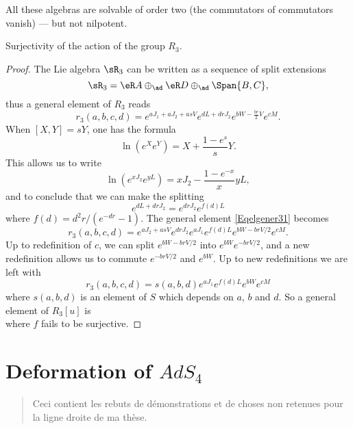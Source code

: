 \let\ANCtheenumi\theenumi
All these algebras are solvable of order two (the commutators of commutators vanish) --- but not nilpotent.

\begin{proposition}
Surjectivity of the action of the group $R_3$.
\end{proposition}

\begin{proof}
The Lie algebra $\sR_3$ can be written as a sequence of split extensions
\[
  \sR_3=\eR A\oplus_{\ad}\eR D\oplus_{\ad}\Span\{ B,C \},
\]
thus a general element of $R_3$ reads
\begin{equation}  \label{Eqelgener31}
r_3(a,b,c,d)= e^{aJ_1+aJ_2+asV} e^{dL+drJ_2} e^{bW-\frac{ br }{2}V} e^{cM}.
\end {equation}
When $[X,Y]=sY$, one has the formula
\begin{equation}
 \ln(e^{X} e^{Y})=X+\frac{ 1- e^{s} }{ s }Y.
\end{equation}
This allows us to write
\[
  \ln( e^{xJ_2} e^{yL})= xJ_2-\frac{ 1- e^{-x} }{ x }yL,
\]
and to conclude that we can make the splitting
\[
   e^{dL+drJ_2}= e^{drJ_2} e^{f(d)L}
\]
where $f(d)=d^{2}r/( e^{-dr}-1)$. The general element \eqref{Eqelgener31} becomes
\[
  r_3(a,b,c,d)= e^{aJ_2+asV} e^{drJ_2} e^{aJ_1} e^{f(d)L} e^{bW-brV/2} e^{cM}.
\]
Up to redefinition of $c$, we can split $ e^{bW-brV/2}$ into $ e^{bW} e^{-brV/2}$, and a new redefinition allows us to commute $ e^{-brV/2}$ and $ e^{bW}$. Up to new redefinitions we are left with
\[
  r_3(a,b,c,d)=s(a,b,d) e^{aJ_1} e^{f(d)L} e^{bW} e^{cM}
\]
where $s(a,b,d)$ is an element of $S$ which depends on $a$, $b$ and $d$. So a general element of $R_3[u]$ is
\begin{equation}
  [ e^{cM} e^{bW} e^{-f(d)L} e^{aJ_1}u]
\end{equation}
where $f$ fails to be surjective.
\end{proof}

%
   \section{Deformation of \texorpdfstring{$AdS_4$}{AdS4}}
%


\begin{abstract}
Ceci contient les rebuts de démonstrations et de choses non retenues pour la ligne droite de ma thèse.
\end{abstract}

